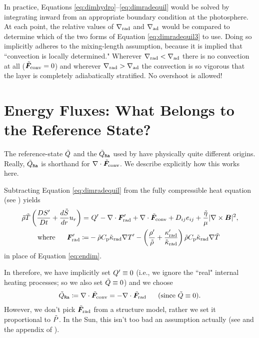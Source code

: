 \documentclass[12pt]{article}
\numberwithin{equation}{section}
\begin{document}
In practice, Equations \eqref{eq:dimhydro}--\eqref{eq:dimradequil} would be solved by integrating inward from an appropriate boundary condition at the photosphere. At each point, the relative values of $\nabla_{\rm rad}$ and $\nabla_{\rm ad}$ would be compared to determine which of the two forms of Equation \eqref{eq:dimradequil3} to use. Doing so implicitly adheres to the mixing-length assumption, because it is implied that ``convection is locally determined." Wherever $\nabla_{\rm rad} <\nabla_{\rm ad}$ there is no convection at all ($\tilde{\bm{F}}_{\rm conv}=0$) and wherever $\nabla_{\rm rad} >\nabla_{\rm ad}$ the convection is so vigorous that the layer is completely adiabatically stratified. No overshoot is allowed! 

\section{Energy Fluxes: What Belongs to the Reference State?}\label{sec:flux}
The reference-state $\tilde{Q}$ and the $\tilde{Q}_{\texttt{Ra}}$ used by {\rayleigh} have physically quite different origins. Really, $\tilde{Q}_{\texttt{Ra}}$ is shorthand for $\nabla\cdot\tilde{\bm{F}}_{\rm conv}$. We describe explicitly how this works here. 

Subtracting Equation \eqref{eq:dimradequil} from the fully compressible heat equation (see \citealt{Matilsky2024b}) yields
\begin{subequations}\label{eq:endim2}
\begin{align}
	\tilde{\rho}\tilde{T} \left(\frac{D{S^\prime}}{Dt} + \frac{d\tilde{S}}{dr} u_r\right) = &\ {Q^\prime} -\nabla\cdot\bm{F}^\prime_{\rm rad}  +\nabla\cdot\tilde{\bm{F}}_{\rm conv}+ D_{ij}e_{ij} + \frac{\tilde{\eta}}{\mu}|\nabla\times\bm{B}|^2,\\
	\text{where}\ \ \ \ \  \bm{F}^\prime_{\rm rad} \coloneqq & -\tilde{\rho} C_{\rm{p}} \tilde{\kappa}_{\rm rad} \nabla{T^\prime} -\left(\frac{{\rho^\prime}}{\tilde{\rho}} + \frac{\kappa^\prime_{\rm rad}}{\tilde{\kappa}_{\rm rad}}\right)\tilde{\rho}C_{\rm{p}}\tilde{\kappa}_{\rm rad}\nabla\tilde{T}
\end{align}
\end{subequations}
in place of Equation \eqref{eq:endim}. 

In {\rayleigh} therefore, we have implicitly set ${Q^\prime}\equiv0$ (i.e., we ignore the ``real" internal heating processes; so we also set $\tilde{Q}\equiv0$) and we choose 
\begin{align}
	\heatra\define \Div\fconvtilde=-\Div\fradtilde\five\text{(since}\ \heattilde\equiv0\text{)}.
\end{align}
However, we don't pick $\tilde{\bm{F}}_{\rm rad}$ from a structure model, rather we set it proportional to $\tilde{P}$. In the Sun, this isn't too bad an assumption actually (see \citealt{Featherstone2016a} and the appendix of \citealt{Matilsky2024}).
\end{document}
